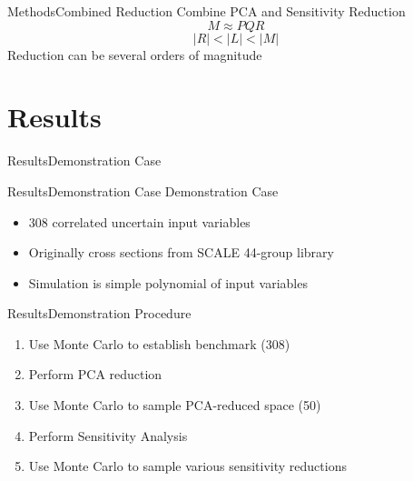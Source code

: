 \documentclass{beamer}
\begin{document}
\begin{frame}{Methods}{Combined Reduction}
  \vfill
  Combine PCA and Sensitivity Reduction
  \begin{equation}
    M \approx P Q R \nonumber
  \end{equation}
  \[|R| < |L| < |M|\]
  \vfill
  Reduction can be several orders of magnitude
  \vfill
\end{frame}

\section{Results}
\begin{frame}{Results}{Demonstration Case}
\end{frame}

\begin{frame}{Results}{Demonstration Case}
  \vfill
  Demonstration Case
  \vfill
  \begin{itemize}
    \item 308 correlated uncertain input variables
  \vfill
    \item Originally cross sections from SCALE 44-group library
  \vfill
    \item Simulation is simple polynomial of input variables
  \end{itemize}
  \vfill
\end{frame}

\begin{frame}{Results}{Demonstration Procedure}
  \vfill
  \begin{enumerate}
    \item Use Monte Carlo to establish benchmark (308)
  \vfill
    \item Perform PCA reduction
  \vfill
    \item Use Monte Carlo to sample PCA-reduced space (50)
  \vfill
    \item Perform Sensitivity Analysis
  \vfill
    \item Use Monte Carlo to sample various sensitivity reductions
  \end{enumerate}
  \vfill
\end{frame}
\end{document}
